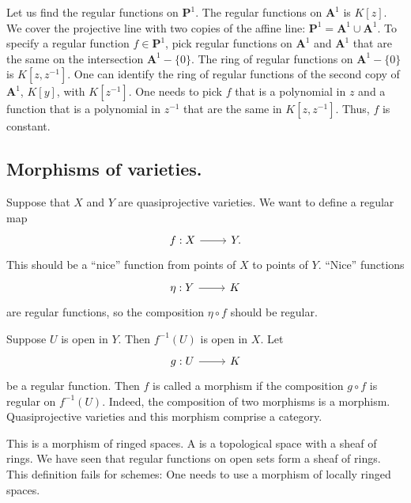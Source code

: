 \documentclass [11 pt, oneside] {article}
\begin{document}
\begin{example}[ ]\label{}
Let us find the regular functions on $\mathbf{P}^1$. The regular functions on $\mathbf{A}^1$ is $K[z]$. We cover the projective line with two copies of the affine line: $\mathbf{P}^1 = \mathbf{A}^1\cup \mathbf{A}^1$. To specify a regular function $f\in \mathbf{P}^1$, pick regular functions on $\mathbf{A}^1$ and $\mathbf{A}^1$ that are the same on the intersection $\mathbf{A}^1-\{0\}$. The ring of regular functions on $\mathbf{A}^1-\{0\}$ is $K[z,z^{-1}]$. One can identify the ring of regular functions of the second copy of $\mathbf{A}^1$, $K[y]$, with $K[z^{-1}]$. One needs to pick $f$ that is a polynomial in $z$ and a function that is a polynomial in $z^{-1}$ that are the same in $K[z,z^{-1}]$. Thus, $f$ is constant.
\end{example}

\subsection{Morphisms of varieties.}
Suppose that $X$ and $Y$ are quasiprojective varieties. We want to define a regular map 
\[
\begin{tikzcd}
f:X\ar[r]&Y.
\end{tikzcd}
\]
This should be a ``nice'' function from points of $X$ to points of $Y$. ``Nice'' functions 
\[
\begin{tikzcd}
\eta:Y\ar[r]&K
\end{tikzcd}
\]
are regular functions, so the composition $\eta\circ f$ should be regular.

Suppose $U$ is open in $Y$. Then $f^{-1}(U)$ is open in $X$. Let 
\[
\begin{tikzcd}
g:U\ar[r]&K
\end{tikzcd}
\]
be a regular function. Then $f$ is called a morphism if the composition $g\circ f$ is regular on $f^{-1}(U)$. Indeed, the composition of two morphisms is a morphism. Quasiprojective varieties and this morphism comprise a category.

\begin{warn}
	This is a morphism of ringed spaces. A  is a topological space with a sheaf of rings. We have seen that regular functions on open sets form a sheaf of rings. This definition fails for schemes: One needs to use a morphism of locally ringed spaces.
\end{warn}
\end{document}
